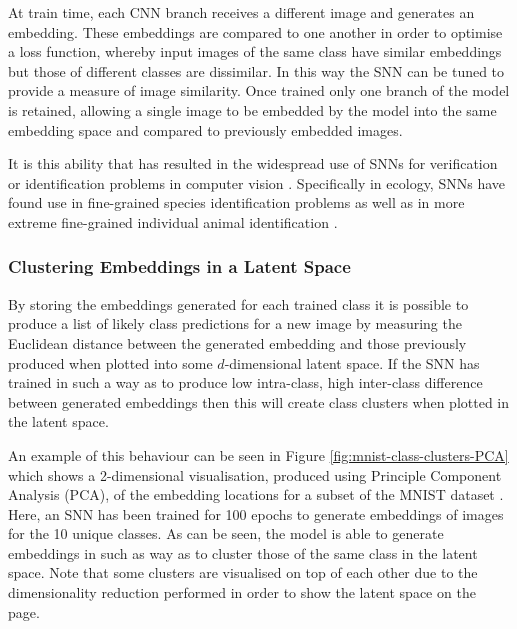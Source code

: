 At train time, each CNN branch receives a different image and generates an embedding. These embeddings are compared to one another in order to optimise a loss function, whereby input images of the same class have similar embeddings but those of different classes are dissimilar. In this way the SNN can be tuned to provide a measure of image similarity. Once trained only one branch of the model is retained, allowing a single image to be embedded by the model into the same embedding space and compared to previously embedded images.

It is this ability that has resulted in the widespread use of SNNs for verification or identification problems in computer vision \cite{dey_signet_2017, wang_discriminative_2020}. Specifically in ecology, SNNs have found use in fine-grained species identification problems \cite{vetrova_hidden_2018, araujo_two-view_2022} as well as in more extreme fine-grained individual animal identification \cite{clapham_automated_2020}. 

\subsubsection{Clustering Embeddings in a Latent Space}\label{ch:ID,sec:deciding,sub:SNN,subsub:ClusteringEmbeddings}

By storing the embeddings generated for each trained class it is possible to produce a list of likely class predictions for a new image by measuring the Euclidean distance between the generated embedding and those previously produced when plotted into some $d$-dimensional latent space. If the SNN has trained in such a way as to produce low intra-class, high inter-class difference between generated embeddings then this will create class clusters when plotted in the latent space. 

An example of this behaviour can be seen in Figure \ref{fig:mnist-class-clusters-PCA} which shows a 2-dimensional visualisation, produced using Principle Component Analysis (PCA), of the embedding locations for a subset of the MNIST dataset \cite{lecun_gradient-based_1998}. Here, an SNN has been trained for 100 epochs to generate embeddings of images for the 10 unique classes. As can be seen, the model is able to generate embeddings in such as way as to cluster those of the same class in the latent space. Note that some clusters are visualised on top of each other due to the dimensionality reduction performed in order to show the latent space on the page. 

